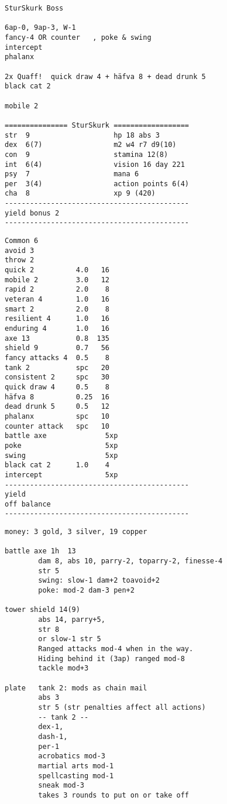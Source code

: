 \pagebreak[2]
\small
\begin{verbatim}
SturSkurk Boss

6ap-0, 9ap-3, W-1
fancy-4 OR counter   , poke & swing
intercept
phalanx

2x Quaff!  quick draw 4 + häfva 8 + dead drunk 5
black cat 2

mobile 2

=============== SturSkurk ==================
str  9                    hp 18 abs 3
dex  6(7)                 m2 w4 r7 d9(10)
con  9                    stamina 12(8)
int  6(4)                 vision 16 day 221
psy  7                    mana 6
per  3(4)                 action points 6(4)
cha  8                    xp 9 (420)
--------------------------------------------
yield bonus 2
--------------------------------------------
\end{verbatim} \goodbreak \begin{verbatim}
Common 6
avoid 3
throw 2
quick 2          4.0   16
mobile 2         3.0   12
rapid 2          2.0    8
veteran 4        1.0   16
smart 2          2.0    8
resilient 4      1.0   16
enduring 4       1.0   16
axe 13           0.8  135
shield 9         0.7   56
fancy attacks 4  0.5    8
tank 2           spc   20
consistent 2     spc   30
quick draw 4     0.5    8
häfva 8          0.25  16
dead drunk 5     0.5   12
phalanx          spc   10
counter attack   spc   10
battle axe              5xp
poke                    5xp
swing                   5xp
black cat 2      1.0    4
intercept               5xp
--------------------------------------------
yield
off balance
--------------------------------------------
\end{verbatim} \goodbreak \begin{verbatim}
money: 3 gold, 3 silver, 19 copper

battle axe 1h  13
        dam 8, abs 10, parry-2, toparry-2, finesse-4
        str 5
        swing: slow-1 dam+2 toavoid+2
        poke: mod-2 dam-3 pen+2

tower shield 14(9)
        abs 14, parry+5,
        str 8
        or slow-1 str 5
        Ranged attacks mod-4 when in the way.
        Hiding behind it (3ap) ranged mod-8
        tackle mod+3

plate   tank 2: mods as chain mail
        abs 3
        str 5 (str penalties affect all actions)
        -- tank 2 --
        dex-1,
        dash-1,
        per-1
        acrobatics mod-3
        martial arts mod-1
        spellcasting mod-1
        sneak mod-3
        takes 3 rounds to put on or take off




\end{verbatim}
